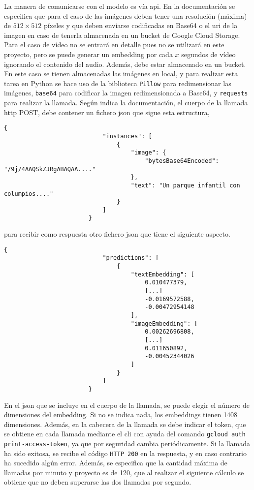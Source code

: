 				La manera de comunicarse con el modelo es vía \gls{api}. En la documentación se especifica que para el caso de las imágenes deben tener una resolución (máxima) de $512 \times 512$ píxeles y que deben enviarse codificadas en Base64 o el \gls{uri} de la imagen en caso de tenerla almacenada en un bucket de Google Cloud Storage. Para el caso de vídeo no se entrará en detalle pues no se utilizará en este proyecto, pero se puede generar un embedding por cada $x$ segundos de vídeo ignorando el contenido del audio. Además, debe estar almacenado en un bucket. En este caso se tienen almacenadas las imágenes en local, y para realizar esta tarea en Python se hace uso de la biblioteca \texttt{Pillow} para redimensionar las imágenes, \texttt{base64} para codificar la imagen redimensionada a Base64, y \texttt{requests} para realizar la llamada. Según indica la documentación, el cuerpo de la llamada \gls{http} POST, debe contener un fichero \gls{json} que sigue esta estructura,
				\begin{center}
					\begin{BVerbatim}[tabsize = 3]
						{
							"instances": [
								{
									"image": {
										"bytesBase64Encoded": "/9j/4AAQSkZJRgABAQAA...."
									}, 
									"text": "Un parque infantil con columpios...."
								}
							]
						}
					\end{BVerbatim}
				\end{center}
				para recibir como respuesta otro fichero \gls{json} que tiene el siguiente aspecto. 
				\begin{center}
					\begin{BVerbatim}[tabsize = 3]
						{
							"predictions": [
								{
									"textEmbedding": [
										0.010477379,
										[...]
										-0.0169572588,
										-0.00472954148
									],
									"imageEmbedding": [
										0.00262696808,
										[...]
										0.011650892,
										-0.00452344026
									]
								}
							]
						}
					\end{BVerbatim}
				\end{center}
				
				En el \gls{json} que se incluye en el cuerpo de la llamada, se puede elegir el número de dimensiones del embedding. Si no se indica nada, los embeddings tienen 1408 dimensiones. Además, en la cabecera de la llamada se debe indicar el token, que se obtiene en cada llamada mediante el \gls{cli} con ayuda del comando \texttt{gcloud auth print-access-token}, ya que por seguridad cambia periódicamente. Si la llamada ha sido exitosa, se recibe el código \texttt{HTTP 200} en la respuesta, y en caso contrario ha sucedido algún error. Además, se especifica que la cantidad máxima de llamadas por minuto y proyecto es de 120, que al realizar el siguiente cálculo se obtiene que no deben superarse las dos llamadas por segundo. 
				
